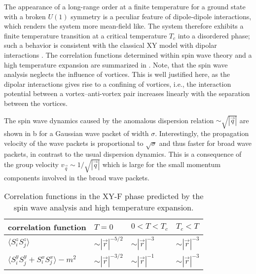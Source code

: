 The appearance of a long-range order at a finite temperature for a ground state with a broken $U(1)$ symmetry is
a peculiar feature of dipole-dipole interactions, which renders the system more mean-field like. The system therefore
exhibits a finite temperature transition at a critical temperature $T_{c}$ into a disordered phase; such a behavior is
consistent with the classical XY model with dipolar interactions \cite{Bruno2001}. The correlation functions determined
within spin wave theory and a high temperature expansion are summarized in .
 Note, that the spin wave analysis neglects the influence of vortices. This is well justified here,
as the dipolar interactions gives rise to a confining of vortices, i.e., the interaction potential
between a vortex--anti-vortex pair increases linearly with the separation between the vortices.

The spin wave dynamics caused by the anomalous dispersion relation $\sim \sqrt{|{\vec q}|}$ are shown in b for a Gaussian wave packet of width $\sigma$. Interestingly, the propagation velocity of the wave packets is proportional to $\sqrt{\sigma}$ and thus faster for broad wave packets, in contrast to the usual dispersion dynamics. This is a consequence of the group velocity $v_{\vec q} \sim 1/\sqrt{|{\vec q}|}$ which is large for the small momentum components involved in the broad wave packets.

\begin{table}
    \centering
    \begin{tabu} to .8\textwidth {X[1.8]X[c]X[c]X[c]}
        \toprule
        correlation function & $T=0$ & $0 < T < T_{c}$ & $T_{c}< T$ \\
        \midrule
        $ \langle S^{z}_{i} S^{z}_{j}\rangle$  &$ \sim |{\vec r}|^{-5/2}$  & $\sim |{\vec r}|^{-3}$ &  $\sim |{\vec r}|^{-3}$ \\
        $ \langle S^{y}_{i} S^{y}_{j}+ S^{x}_{i} S^{x}_{j}\rangle- m^2$  &$ \sim |{\vec r}|^{-3/2}$ &  $\sim |{\vec r}|^{-1}$ &  $\sim |{\vec r}|^{-3}$ \\
        \bottomrule
    \end{tabu}
    \caption{Correlation functions in the XY-F phase predicted by the spin wave analysis and high temperature expansion.}
\end{table}





